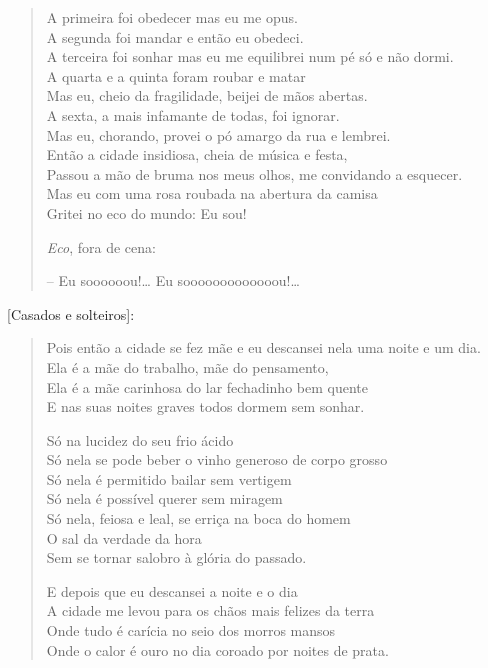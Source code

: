 {\begin{verse}
A primeira foi obedecer mas eu me opus.\\
A segunda foi mandar e então eu obedeci.\\
A terceira foi sonhar mas eu me equilibrei num pé só e não dormi.\\
A quarta e a quinta foram roubar e matar\\
Mas eu, cheio da fragilidade, beijei de mãos abertas.\\
A sexta, a mais infamante de todas, foi ignorar.\\
Mas eu, chorando, provei o pó amargo da rua e lembrei.\\
Então a cidade insidiosa, cheia de música e festa,\\
Passou a mão de bruma nos meus olhos, me convidando a esquecer.\\
Mas eu com uma rosa roubada na abertura da camisa\\
Gritei no eco do mundo: Eu sou!

\quad\quad\emph{Eco}, fora de cena:

\quad\quad\quad\quad{}-- Eu soooooou!\ldots{} Eu sooooooooooooou!\ldots{}
\end{verse}

[Casados e solteiros]:

\begin{verse}
Pois então a cidade se fez mãe e eu descansei nela uma noite e um dia.\\
Ela é a mãe do trabalho, mãe do pensamento,\\
Ela é a mãe carinhosa do lar fechadinho bem quente\\
E nas suas noites graves todos dormem sem sonhar.

Só na lucidez do seu frio ácido\\
Só nela se pode beber o vinho generoso de corpo grosso\\
Só nela é permitido bailar sem vertigem\\
Só nela é possível querer sem miragem\\
Só nela, feiosa e leal, se erriça na boca do homem\\
O sal da verdade da hora\\
Sem se tornar salobro à glória do passado.

E depois que eu descansei a noite e o dia\\
A cidade me levou para os chãos mais felizes da terra\\
Onde tudo é carícia no seio dos morros mansos\\
Onde o calor é ouro no dia coroado por noites de prata.


\end{verse}}
